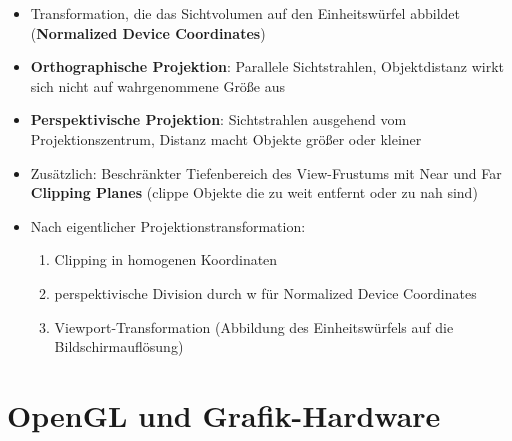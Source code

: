 \documentclass[10pt,a4paper]{article}
\begin{document}
	\begin{itemize}
		\item Transformation, die das Sichtvolumen auf den Einheitswürfel abbildet (\textbf{Normalized Device Coordinates})
		\item \textbf{Orthographische Projektion}: Parallele Sichtstrahlen, Objektdistanz wirkt sich nicht auf wahrgenommene Größe aus
		\item \textbf{Perspektivische Projektion}: Sichtstrahlen ausgehend vom Projektionszentrum, Distanz macht Objekte größer oder kleiner
		\item Zusätzlich: Beschränkter Tiefenbereich des View-Frustums mit Near und Far \textbf{Clipping Planes} (clippe Objekte die zu weit entfernt oder zu nah sind)
		\item Nach eigentlicher Projektionstransformation:
		\begin{enumerate}
			\item Clipping in homogenen Koordinaten
			\item perspektivische Division durch w für Normalized Device Coordinates
			\item Viewport-Transformation (Abbildung des Einheitswürfels auf die Bildschirmauflösung)
		\end{enumerate}
	\end{itemize}

	\newpage
	\section{OpenGL und Grafik-Hardware}
	\label{gl:sec:opengl_und_grafik_hardware}
\end{document}
